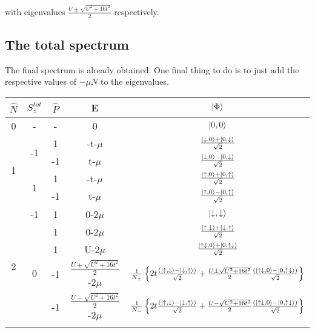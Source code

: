\documentclass{article}
\begin{document}
with eigenvalues \(\frac{U\pm\sqrt{U^2+16 t^2}}{2}\) respectively.
\subsection{The total spectrum}
The final spectrum is already obtained. One final thing to do is to just add the respective values of \(-\mu N\) to the eigenvalues.
\begin{table}[htb]
\begin{center}
\begin{tabular}{@{}ccccc@{}}
\toprule
\(\hat{N}\) & \(S_z^{tot}\) & \(\hat{P}\) & E & \(\ket{\Phi}\)\\
\toprule
0 & - & - & 0 & \(\ket{0,0}\) \\ \toprule
\multicolumn{1}{c}{\multirow{4}{*}{1}} & \multirow{2}{*}{-1} & 1  & -t-\(\mu\)  & \(\frac{\ket{\downarrow,0}+\ket{0,\downarrow}}{\sqrt{2}}\)  \\ \cmidrule(l){3-5} 
\multicolumn{1}{c}{}                   &                     & -1 & t-\(\mu\)   & \(\frac{\ket{\downarrow,0}-\ket{0,\downarrow}}{\sqrt{2}}\)  \\ \cmidrule(l){2-5}
\multicolumn{1}{c}{}                   & \multirow{2}{*}{1}  & 1  & -t-\(\mu\)  & \(\frac{\ket{\uparrow,0}+\ket{0,\uparrow}}{\sqrt{2}}\)  \\ \cmidrule(l){3-5} 
\multicolumn{1}{c}{}                   &                     & -1 & t-\(\mu\)   & \(\frac{\ket{\uparrow,0}-\ket{0,\uparrow}}{\sqrt{2}}\)  \\ \toprule
\multirow{6}{*}{2}                     & -1                  & 1  & 0-\(2\mu\)   & \(\ket{\downarrow,\downarrow}\)  \\ \cmidrule(l){2-5} 
                                       & \multirow{4}{*}{0}  & 1  & 0-\(2\mu\)   & \(\frac{\ket{\uparrow,\downarrow}+\ket{\downarrow,\uparrow}}{\sqrt{2}}\)  \\ \cmidrule(l){3-5} 
                                       &                     & 1  & U-\(2\mu\)   & \(\frac{\ket{\uparrow\downarrow,0}+\ket{0,\uparrow\downarrow}}{\sqrt{2}}\)  \\ \cmidrule(l){3-5} 
                                       &                     & -1 & \(\frac{U+\sqrt{U^2+16 t^2}}{2}\)-\(2\mu\)    & \(\frac{1}{N_\pm}\left\{{2t \frac{(\ket{\uparrow,\downarrow}-\ket{\downarrow,\uparrow})}{\sqrt{2}} + \frac{U\pm\sqrt{U^2+16 t^2}}{2} \frac{(\ket{\uparrow\downarrow,0}-\ket{0,\uparrow\downarrow})}{\sqrt{2}}}\right\}\)  \\ \cmidrule(l){3-5} 
                                       &                     & -1 & \(\frac{U-\sqrt{U^2+16 t^2}}{2}\)-\(2\mu\)    & \(\frac{1}{N_-}\left\{{2t \frac{(\ket{\uparrow,\downarrow}-\ket{\downarrow,\uparrow})}{\sqrt{2}} + \frac{U-\sqrt{U^2+16 t^2}}{2} \frac{(\ket{\uparrow\downarrow,0}-\ket{0,\uparrow\downarrow})}{\sqrt{2}}}\right\}\)  \\ \cmidrule(l){2-5} 

\end{tabular}
\end{center}
\end{table}
\end{document}
